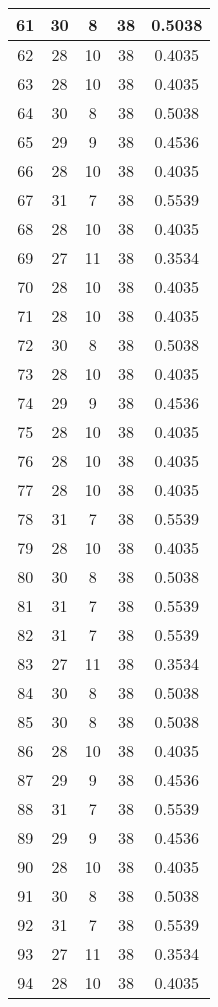 \documentclass[letterpaper, 12pt]{article}
\begin{document}
\begin{longtable}{|c|c|c|c|c|}
\hline
61 & 30 & 8 & 38 & 0.5038 \\
\hline
62 & 28 & 10 & 38 & 0.4035 \\
\hline
63 & 28 & 10 & 38 & 0.4035 \\
\hline
64 & 30 & 8 & 38 & 0.5038 \\
\hline
65 & 29 & 9 & 38 & 0.4536 \\
\hline
66 & 28 & 10 & 38 & 0.4035 \\
\hline
67 & 31 & 7 & 38 & 0.5539 \\
\hline
68 & 28 & 10 & 38 & 0.4035 \\
\hline
69 & 27 & 11 & 38 & 0.3534 \\
\hline
70 & 28 & 10 & 38 & 0.4035 \\
\hline
71 & 28 & 10 & 38 & 0.4035 \\
\hline
72 & 30 & 8 & 38 & 0.5038 \\
\hline
73 & 28 & 10 & 38 & 0.4035 \\
\hline
74 & 29 & 9 & 38 & 0.4536 \\
\hline
75 & 28 & 10 & 38 & 0.4035 \\
\hline
76 & 28 & 10 & 38 & 0.4035 \\
\hline
77 & 28 & 10 & 38 & 0.4035 \\
\hline
78 & 31 & 7 & 38 & 0.5539 \\
\hline
79 & 28 & 10 & 38 & 0.4035 \\
\hline
80 & 30 & 8 & 38 & 0.5038 \\
\hline
81 & 31 & 7 & 38 & 0.5539 \\
\hline
82 & 31 & 7 & 38 & 0.5539 \\
\hline
83 & 27 & 11 & 38 & 0.3534 \\
\hline
84 & 30 & 8 & 38 & 0.5038 \\
\hline
85 & 30 & 8 & 38 & 0.5038 \\
\hline
86 & 28 & 10 & 38 & 0.4035 \\
\hline
87 & 29 & 9 & 38 & 0.4536 \\
\hline
88 & 31 & 7 & 38 & 0.5539 \\
\hline
89 & 29 & 9 & 38 & 0.4536 \\
\hline
90 & 28 & 10 & 38 & 0.4035 \\
\hline
91 & 30 & 8 & 38 & 0.5038 \\
\hline
92 & 31 & 7 & 38 & 0.5539 \\
\hline
93 & 27 & 11 & 38 & 0.3534 \\
\hline
94 & 28 & 10 & 38 & 0.4035 \\

\end{longtable}
\end{document}
